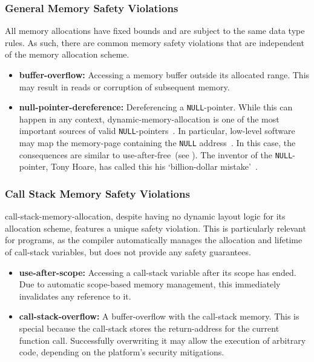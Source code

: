 \subsubsection{General Memory Safety Violations}

All memory allocations have fixed bounds and are subject to the same data type rules. As such, there are common memory safety violations that are independent of the memory allocation scheme.

\begin{itemize}
  \item \textbf{\Gls{buffer-overflow}:} Accessing a memory buffer outside its allocated range. This may result in reads or corruption of subsequent memory.
  \item \textbf{\Gls{null-pointer-dereference}:} Dereferencing a \lstinline[style=c]{NULL}-pointer. While this can happen in any context, \gls{dynamic-memory-allocation} is one of the most important sources of valid \lstinline[style=c]{NULL}-pointers~\cite{ISO:2018:III}. In particular, low-level software may map the \gls{memory-page} containing the \lstinline[style=c]{NULL} address~\cite{edk2}. In this case, the consequences are similar to \gls{use-after-free}~(see ). The inventor of the \lstinline[style=c]{NULL}-pointer, Tony Hoare, has called this his `billion-dollar mistake'~\cite{null-ref-presentation}.
\end{itemize}

\subsubsection{Call Stack Memory Safety Violations}

\Gls{call-stack-memory-allocation}, despite having no dynamic layout logic for its allocation scheme, features a unique safety violation. This is particularly relevant for  programs, as the compiler automatically manages the allocation and lifetime of \gls{call-stack} variables, but does not provide any safety guarantees.

\begin{itemize}
  \item \textbf{\Gls{use-after-scope}:} Accessing a \gls{call-stack} variable after its scope has ended. Due to automatic scope-based memory management, this immediately invalidates any reference to it.
  \item \textbf{\Gls{call-stack-overflow}:} A \gls{buffer-overflow} with the \gls{call-stack} memory. This is special because the \gls{call-stack} stores the \gls{return-address} for the current function call. Successfully overwriting it may allow the execution of arbitrary code, depending on the platform's security mitigations.
\end{itemize}

